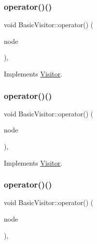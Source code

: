 \subsubsection{\texorpdfstring{operator()()}{operator()()}\hspace{0.1cm}{\footnotesize\ttfamily [19/59]}}
{\footnotesize\ttfamily void Basic\+Visitor\+::operator() (\begin{DoxyParamCaption}\item[{const \hyperlink{struct_unary_expression}{Unary\+Expression} \&}]{node }\end{DoxyParamCaption})\hspace{0.3cm}{\ttfamily [inline]}, {\ttfamily [virtual]}}



Implements \hyperlink{struct_visitor_ad2e06814dadca4469f4036ba9a00afd7}{Visitor}.

\mbox{\label{struct_basic_visitor_a354c75bf84d88737eed7900a9c5d2dd6}} 
\subsubsection{\texorpdfstring{operator()()}{operator()()}\hspace{0.1cm}{\footnotesize\ttfamily [20/59]}}
{\footnotesize\ttfamily void Basic\+Visitor\+::operator() (\begin{DoxyParamCaption}\item[{const \hyperlink{struct_binary_expression}{Binary\+Expression} \&}]{node }\end{DoxyParamCaption})\hspace{0.3cm}{\ttfamily [inline]}, {\ttfamily [virtual]}}



Implements \hyperlink{struct_visitor_a6132b5969ec220e7c98af3a957f48a0e}{Visitor}.

\mbox{\label{struct_basic_visitor_a168eeccdaf38ac6f9cc2f32feefddcc5}} 
\subsubsection{\texorpdfstring{operator()()}{operator()()}\hspace{0.1cm}{\footnotesize\ttfamily [21/59]}}
{\footnotesize\ttfamily void Basic\+Visitor\+::operator() (\begin{DoxyParamCaption}\item[{const \hyperlink{struct_conditional_expression}{Conditional\+Expression} \&}]{node }\end{DoxyParamCaption})\hspace{0.3cm}{\ttfamily [inline]}, {\ttfamily [virtual]}}



